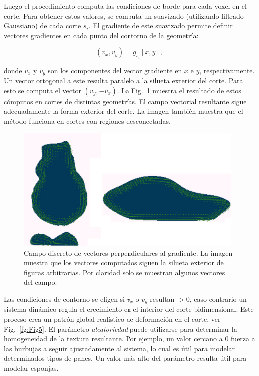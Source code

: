 Luego el procedimiento computa las condiciones de borde para cada voxel en el corte.
Para obtener estos valores, se computa un suavizado (utilizando filtrado Gaussiano) de cada corte $s_{i}$.
El gradiente de este suavizado permite definir vectores gradientes en cada punto del contorno de la geometría:

$$\displaystyle (v_{x},v_{y}) = g_{s_{i}}[x,y],$$

\noindent donde $v_{x}$ y $v_{y}$ son los componentes del vector gradiente en $x$ e $y$, respectivamente.
Un vector ortogonal a este resulta paralelo a la silueta exterior del corte.
Para esto se computa el vector $(v_{y},-v_{x})$.
La Fig.~\ref{fg:Fig4} muestra el resultado de estos cómputos en cortes de distintas geometrías.
El campo vectorial resultante sigue adecuadamente la forma exterior del corte.
La imagen también muestra que el método funciona en cortes con regiones desconectadas.


\begin{figure}
  \centerline{\includegraphics[width=11cm]{figures/Fig4}}
  \caption[Campo discreto de vectores perpendiculares al gradiente]{Campo discreto de vectores perpendiculares al gradiente. La imagen muestra que los vectores computados siguen la silueta exterior de figuras arbitrarias. Por claridad solo se muestran algunos vectores del campo.}
  \label{fg:Fig4}
\end{figure}

Las condiciones de contorno se eligen si $v_{x}$ o $v_{y}$ resultan $>0$, caso contrario un sistema dinámico regula el crecimiento en el interior del corte bidimensional.
Este proceso crea un patrón global realístico de deformación en el corte, ver Fig.~\ref{fg:Fig5}.
El parámetro {\em aleatoriedad} puede utilizarse para determinar la homogeneidad de la textura resultante.
Por ejemplo, un valor cercano a 0 fuerza a las burbujas a seguir ajustadamente al sistema, lo cual es útil para modelar determinados tipos de panes.
Un valor más alto del parámetro resulta útil para modelar esponjas.


